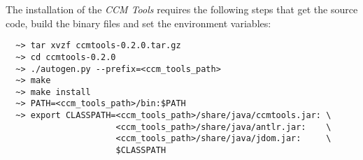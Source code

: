 The installation of the {\it CCM Tools} requires the following steps that get
the source code, build the binary files and set the environment variables:
\begin{verbatim}
  ~> tar xvzf ccmtools-0.2.0.tar.gz
  ~> cd ccmtools-0.2.0
  ~> ./autogen.py --prefix=<ccm_tools_path>
  ~> make
  ~> make install
  ~> PATH=<ccm_tools_path>/bin:$PATH
  ~> export CLASSPATH=<ccm_tools_path>/share/java/ccmtools.jar: \
                      <ccm_tools_path>/share/java/antlr.jar:    \
                      <ccm_tools_path>/share/java/jdom.jar:     \
                      $CLASSPATH
\end{verbatim}












